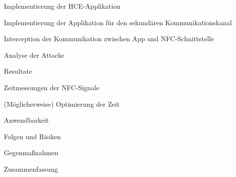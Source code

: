 \documentclass[a4paper,10pt,ngerman]{INSOexpose}
\begin{document}
\begin{samepage}
\begin{contentstructure}
\begin{contentstructure}
		\item Implementierung der HCE-Applikation
		\item Implementierung der Applikation für den sekundären Kommunikationskanal
		\item Interception der Kommunikation zwischen App und NFC-Schnittstelle
		\end{contentstructure}
	\item Analyse der Attacke 
		\begin{contentstructure}
		\item Resultate
			\begin{contentstructure}
			\item Zeitmessungen der NFC-Signale
			\item (Möglicherweise) Optimierung der Zeit
			\end{contentstructure}
		\item Anwendbarkeit
		\item Folgen und Risiken
		\end{contentstructure}
	\item Gegenmaßnahmen 
	\item Zusammenfassung 
  \end{contentstructure}
\end{samepage}


\printbibliography
\end{document}
